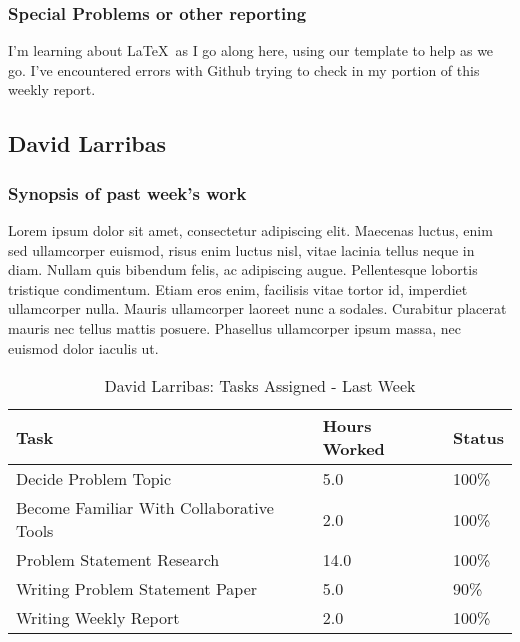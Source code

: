 \documentclass[12pt,article,compsoc]{IEEEtran}
\begin{document}
	\subsubsection*{Special Problems or other reporting}
	I'm learning about \LaTeX \ as I go along here, using our template to help as we go. I've encountered errors with Github trying to check in my portion of this weekly report.
	\clearpage

\subsection{David Larribas}

	\subsubsection*{Synopsis of past week's work}

	Lorem ipsum dolor sit amet, consectetur adipiscing elit. Maecenas luctus, enim sed ullamcorper euismod, risus enim luctus nisl, vitae lacinia tellus neque in diam. Nullam quis bibendum felis, ac adipiscing augue. Pellentesque lobortis tristique condimentum. Etiam eros enim, facilisis vitae tortor id, imperdiet ullamcorper nulla. Mauris ullamcorper laoreet nunc a sodales. Curabitur placerat mauris nec tellus mattis posuere. Phasellus ullamcorper ipsum massa, nec euismod dolor iaculis ut.

	\begin{table}[ht]
	\renewcommand{\arraystretch}{1.3}
		\caption{David Larribas: Tasks Assigned - Last Week}
		
		\label{Summary of David Larribas' activities: last week}
		
		\centering
		\begin{tabular}{p{5.5cm}|p{1cm}|p{1cm}}
		\hline
		\bfseries 	Task		 		& \bfseries Hours Worked	& \bfseries Status	\\
		\hline\hline
					Decide Problem Topic		& 5.0					& 100\%				\\	%
					Become Familiar With Collaborative Tools	& 2.0					& 100\%				\\
					Problem Statement Research	& 14.0					& 100\%				\\
					Writing Problem Statement Paper	& 5.0				& 90\%				\\
					Writing Weekly Report		& 2.0					& 100\%				\\	
		\hline
		\end{tabular}
	\end{table}
\end{document}
